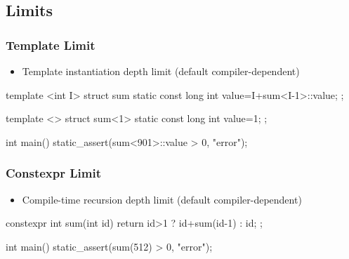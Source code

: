 \documentclass[aspectratio=43]{beamer}
\begin{document}
\subsection{Limits}

\begin{frame}[fragile]\frametitle{Template Limit}
  \begin{itemize}
    \item Template instantiation depth limit (default compiler-dependent)
  \end{itemize}

\begin{Cpplisting}{}
template <int I>
struct sum{
    static const long int value=I+sum<I-1>::value;
};

template <>
struct sum<1>{
    static const long int value=1;
};

int main(){
    static_assert(sum<901>::value > 0, "error");
}
\end{Cpplisting}
\end{frame}


\begin{frame}[fragile]\frametitle{Constexpr Limit}
  \begin{itemize}
    \item Compile-time recursion depth limit (default compiler-dependent)
  \end{itemize}

\begin{Cpplisting}{}






constexpr int sum(int id){
    return id>1 ? id+sum(id-1) : id;
};

int main(){
    static_assert(sum(512) > 0, "error");
}
\end{Cpplisting}
\end{frame}

\end{document}
